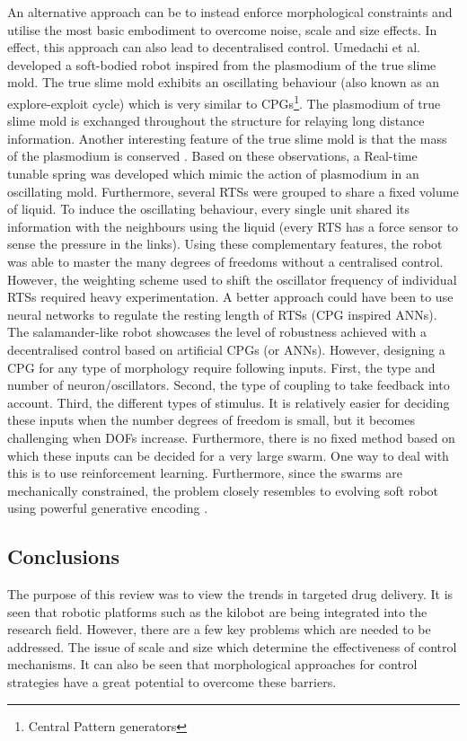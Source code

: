 \documentclass[11pt,a4paper]{article}
\begin{document}
\begin{multicols}{2}
An alternative approach can be to instead enforce morphological constraints and utilise the most basic embodiment to overcome noise, scale and size effects. In effect, this approach can also lead to decentralised control. Umedachi et al. developed a soft-bodied robot inspired from the plasmodium of the true slime mold\cite{umedachi2013true}. The true slime mold exhibits an oscillating behaviour (also known as an explore-exploit cycle) which is very similar to CPGs\footnote{Central Pattern generators}. The plasmodium of true slime mold is exchanged throughout the structure for relaying long distance information. Another interesting feature of the true slime mold is that the mass of the plasmodium is conserved \cite{ishiguro2008fully}. Based on these observations, a Real-time tunable spring was developed which mimic the action of plasmodium in an oscillating mold. Furthermore, several RTSs were grouped to share a fixed volume of liquid. To induce the oscillating behaviour, every single unit shared its information with the neighbours using the liquid (every RTS has a force sensor to sense the pressure in the links). Using these complementary features, the robot was able to master the many degrees of freedoms without a centralised control. However, the weighting scheme used to shift the oscillator frequency of individual RTSs required heavy experimentation. A better approach could have been to use neural networks to regulate the resting length of RTSs (CPG inspired ANNs). The salamander-like robot \cite{ijspeert2008central} showcases the level of robustness achieved with a decentralised control based on artificial CPGs (or ANNs). However, designing a CPG for any type of morphology require following inputs. First, the type and number of neuron/oscillators. Second, the type of coupling to take feedback into account. Third, the different types of stimulus. It is relatively easier for deciding these inputs when the number degrees of freedom is small, but it becomes challenging when DOFs increase. Furthermore, there is no fixed method based on which these inputs can be decided for a very large swarm. One way to deal with this is to use reinforcement learning. Furthermore, since the swarms are mechanically constrained, the problem closely resembles to evolving soft robot using powerful generative encoding \cite{Cheney2013UEE24633722463404}.
 
\subsection{Conclusions}\label{literature}
The purpose of this review was to view the trends in targeted drug delivery. It is seen that robotic platforms such as the kilobot are being integrated into the research field. However, there are a few key problems which are needed to be addressed. The issue of scale and size which determine the effectiveness of control mechanisms. It can also be seen that morphological approaches for control strategies have a great potential to overcome these barriers.


\end{multicols}
\end{document}
